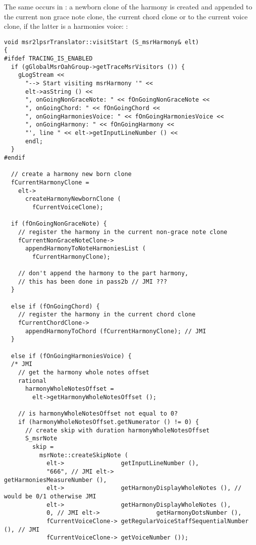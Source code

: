 The same occurs in : a newborn clone of the harmony is created and appended to the current non grace note clone, the current chord clone or to the current voice clone, if the latter is a harmonies voice: %
:
\begin{lstlisting}[language=CPlusPlus]
void msr2lpsrTranslator::visitStart (S_msrHarmony& elt)
{
#ifdef TRACING_IS_ENABLED
  if (gGlobalMsrOahGroup->getTraceMsrVisitors ()) {
    gLogStream <<
      "--> Start visiting msrHarmony '" <<
      elt->asString () <<
      ", onGoingNonGraceNote: " << fOnGoingNonGraceNote <<
      ", onGoingChord: " << fOnGoingChord <<
      ", onGoingHarmoniesVoice: " << fOnGoingHarmoniesVoice <<
      ", onGoingHarmony: " << fOnGoingHarmony <<
      "', line " << elt->getInputLineNumber () <<
      endl;
  }
#endif

  // create a harmony new born clone
  fCurrentHarmonyClone =
    elt->
      createHarmonyNewbornClone (
        fCurrentVoiceClone);

  if (fOnGoingNonGraceNote) {
    // register the harmony in the current non-grace note clone
    fCurrentNonGraceNoteClone->
      appendHarmonyToNoteHarmoniesList (
        fCurrentHarmonyClone);

    // don't append the harmony to the part harmony,
    // this has been done in pass2b // JMI ???
  }

  else if (fOnGoingChord) {
    // register the harmony in the current chord clone
    fCurrentChordClone->
      appendHarmonyToChord (fCurrentHarmonyClone); // JMI
  }

  else if (fOnGoingHarmoniesVoice) {
  /* JMI
    // get the harmony whole notes offset
    rational
      harmonyWholeNotesOffset =
        elt->getHarmonyWholeNotesOffset ();

    // is harmonyWholeNotesOffset not equal to 0?
    if (harmonyWholeNotesOffset.getNumerator () != 0) {
      // create skip with duration harmonyWholeNotesOffset
      S_msrNote
        skip =
          msrNote::createSkipNote (
            elt->                getInputLineNumber (),
            "666", // JMI elt->                getHarmoniesMeasureNumber (),
            elt->                getHarmonyDisplayWholeNotes (), // would be 0/1 otherwise JMI
            elt->                getHarmonyDisplayWholeNotes (),
            0, // JMI elt->                getHarmonyDotsNumber (),
            fCurrentVoiceClone-> getRegularVoiceStaffSequentialNumber (), // JMI
            fCurrentVoiceClone-> getVoiceNumber ());


\end{lstlisting}
